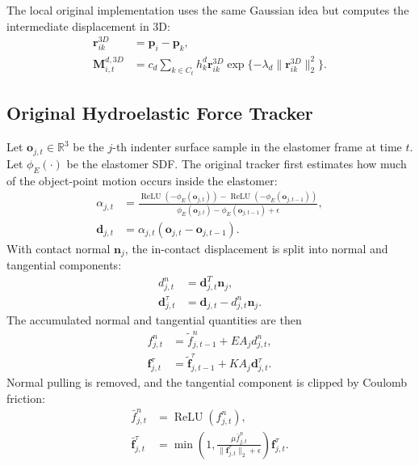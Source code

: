 \documentclass[11pt]{article}
\newcommand{\ReLU}{\operatorname{ReLU}}
\newcommand{\R}{\mathbb{R}}
\begin{document}
The local original implementation uses the same Gaussian idea but computes the
intermediate displacement in 3D:
\begin{align}
    \mathbf{r}_{ik}^{3D}
    &=
    \mathbf{p}_i-\mathbf{p}_k, \\
    \mathbf{M}^{d,3D}_{i,t}
    &=
    c_d
    \sum_{k\in C_t}
    h^d_k
    \mathbf{r}^{3D}_{ik}
    \exp\{-\lambda_d\|\mathbf{r}^{3D}_{ik}\|_2^2\}.
    \label{eq:original-code-dilation}
\end{align}

\subsection{Original Hydroelastic Force Tracker}

Let $\mathbf{o}_{j,t}\in\R^3$ be the $j$-th indenter surface sample in the
elastomer frame at time $t$. Let $\phi_E(\cdot)$ be the elastomer SDF. The
original tracker first estimates how much of the object-point motion occurs
inside the elastomer:
\begin{align}
    \alpha_{j,t}
    &=
    \frac{
        \ReLU(-\phi_E(\mathbf{o}_{j,t}))
        -
        \ReLU(-\phi_E(\mathbf{o}_{j,t-1}))
    }{
        \phi_E(\mathbf{o}_{j,t})-\phi_E(\mathbf{o}_{j,t-1})+\epsilon
    }, \\
    \mathbf{d}_{j,t}
    &=
    \alpha_{j,t}
    \left(
        \mathbf{o}_{j,t}-\mathbf{o}_{j,t-1}
    \right).
    \label{eq:original-displacement}
\end{align}
With contact normal $\mathbf{n}_j$, the in-contact displacement is split into
normal and tangential components:
\begin{align}
    d^n_{j,t}
    &=
    \mathbf{d}_{j,t}^{T}\mathbf{n}_j, \\
    \mathbf{d}^{\tau}_{j,t}
    &=
    \mathbf{d}_{j,t}
    -
    d^n_{j,t}\mathbf{n}_j.
    \label{eq:original-normal-tangent-split}
\end{align}
The accumulated normal and tangential quantities are then
\begin{align}
    f^n_{j,t}
    &=
    \tilde{f}^{n}_{j,t-1}
    +
    E A_j d^n_{j,t}, \\
    \mathbf{f}^{\tau}_{j,t}
    &=
    \tilde{\mathbf{f}}^{\tau}_{j,t-1}
    +
    K A_j \mathbf{d}^{\tau}_{j,t}.
    \label{eq:original-force-update}
\end{align}
Normal pulling is removed, and the tangential component is clipped by Coulomb
friction:
\begin{align}
    \bar{f}^{n}_{j,t}
    &=
    \ReLU(f^n_{j,t}), \\
    \bar{\mathbf{f}}^{\tau}_{j,t}
    &=
    \min\left(
        1,
        \frac{\mu\bar{f}^{n}_{j,t}}
        {\|\mathbf{f}^{\tau}_{j,t}\|_2+\epsilon}
    \right)
    \mathbf{f}^{\tau}_{j,t}.
    \label{eq:original-friction}
\end{align}
\end{document}
